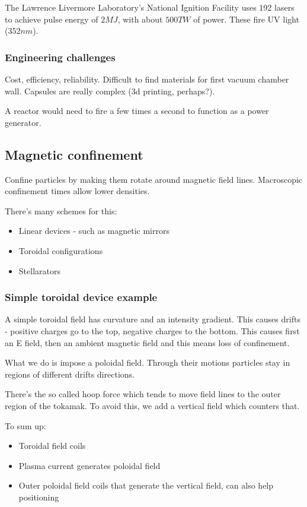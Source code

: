 \documentclass[PlasmaNotes.tex]{subfiles}
\begin{document}
The Lawrence Livermore Laboratory's National Ignition Facility uses 192 lasers to achieve pulse energy of $2 MJ$, with about $500 TW$ of power. These fire UV light ($352 nm$).

\subsubsection{Engineering challenges}

Cost, efficiency, reliability. Difficult to find materials for first vacuum chamber wall. Capsules are really complex (3d printing, perhaps?).

A reactor would need to fire a few times a second to function as a power generator.

\subsection{Magnetic confinement}

Confine particles by making them rotate around magnetic field lines. Macroscopic confinement times allow lower densities.

There's many schemes for this:
\begin{itemize}
 \item Linear devices - such as magnetic mirrors
 \item Toroidal configurations
 \item Stellarators
\end{itemize}

\subsubsection{Simple toroidal device example}

A simple toroidal field has curvature and an intensity gradient. This causes drifts - positive charges go to the top, negative charges to the bottom. This causes first an E field, then an ambient magnetic field and this means loss of confinement.

What we do is impose a poloidal field. Through their motions particles stay in regions of different drifts directions.

There's the so called hoop force which tends to move field lines to the outer region of the tokamak. To avoid this, we add a vertical field which counters that.

To sum up:
\begin{itemize}
 \item Toroidal field coils
 \item Plasma current generates poloidal field
 \item Outer poloidal field coils that generate the vertical field, can also help positioning 
\end{itemize}
\end{document}
